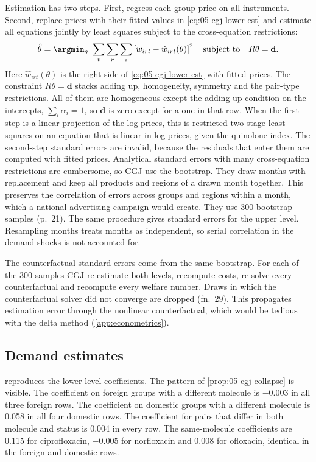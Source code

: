  Estimation has two steps. First, regress each group price on all instruments.
Second, replace prices with their fitted values in \eqref{eq:05-cgj-lower-est} and estimate all equations jointly by
least squares subject to the cross-equation restrictions:
\begin{equation}\label{eq:05-cgj-cls}
\hat\theta = \argmin_{\theta}\ \sum_{t}\sum_{r}\sum_{i}\left[w_{irt} - \hat w_{irt}(\theta)\right]^2
\quad\text{subject to}\quad R\theta = \mathbf{d}.
\end{equation}
Here $\hat w_{irt}(\theta)$ is the right side of \eqref{eq:05-cgj-lower-est} with fitted prices. The constraint
$R\theta = \mathbf{d}$ stacks adding up, homogeneity, symmetry and the pair-type restrictions. All of them are homogeneous
except the adding-up condition on the intercepts, $\sum_i\alpha_i = 1$, so $\mathbf{d}$ is zero except for a one in that
row. When the first step is a linear projection of the
log prices, this is restricted two-stage least squares on an equation that is linear in log prices, given the
quinolone index. The second-step standard errors are invalid, because the residuals that enter them are computed
with fitted prices. Analytical standard errors with many cross-equation restrictions are cumbersome, so CGJ use
the bootstrap. They draw months with replacement and keep all products and regions of a drawn month
together. This preserves the correlation of errors across groups and regions within a month, which a national
advertising campaign would create. They use 300 bootstrap samples (p.~21). The same procedure gives standard errors
for the upper level. Resampling months treats months as independent, so serial correlation in the demand shocks is not
accounted for.

The counterfactual standard errors come from the same bootstrap. For each of the 300 samples CGJ re-estimate both
levels, recompute costs, re-solve every counterfactual and recompute every welfare number. Draws in which the
counterfactual solver did not converge are dropped (fn.~29). This propagates estimation error through the nonlinear
counterfactual, which would be tedious with the delta method (\cref{app:econometrics}).

\subsection{Demand estimates}\label{sec:05-cgj-elasticities}

 reproduces the lower-level coefficients. The pattern of \cref{prop:05-cgj-collapse} is
visible. The coefficient on foreign groups with a different molecule is $-0.003$ in all three foreign rows. The
coefficient on domestic groups with a different molecule is 0.058 in all four domestic rows. The coefficient for pairs
that differ in both molecule and status is 0.004 in every row. The same-molecule coefficients are 0.115 for
ciprofloxacin, $-0.005$ for norfloxacin and 0.008 for ofloxacin, identical in the foreign and domestic rows.

